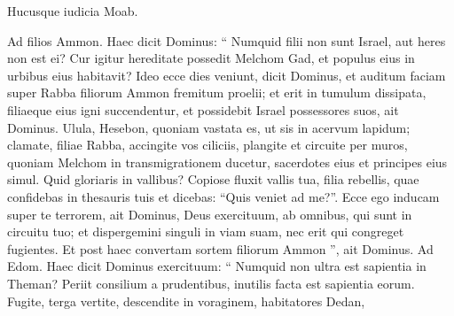 \begin{biblechapter}
\begin{biblechapter}
\begin{biblechapter}
\begin{biblechapter}
\begin{biblechapter}
\begin{biblechapter}
\begin{biblechapter}
\begin{biblechapter}
\begin{biblechapter}
\begin{biblechapter}
\begin{biblechapter}
\begin{biblechapter}
\begin{biblechapter}
\begin{biblechapter}
\begin{biblechapter}
\begin{biblechapter}
\begin{biblechapter}
\begin{biblechapter}
\begin{biblechapter}
\begin{biblechapter}
\begin{biblechapter}
\begin{biblechapter}
\begin{biblechapter}
\begin{biblechapter}
\begin{biblechapter}
\begin{biblechapter}
\begin{biblechapter}
\begin{biblechapter}
\begin{biblechapter}
\begin{biblechapter}
\begin{biblechapter}
\begin{biblechapter}
\begin{biblechapter}
\begin{biblechapter}
\begin{biblechapter}
\begin{biblechapter}
\begin{biblechapter}
\begin{biblechapter}
\begin{biblechapter}
\begin{biblechapter}
\begin{biblechapter}
\begin{biblechapter}
\begin{biblechapter}
\begin{biblechapter}
\begin{biblechapter}
\begin{biblechapter}
\begin{biblechapter}
\begin{biblechapter}
 Hucusque iudicia Moab.
 
\begin{biblechapter}
\verse Ad filios Ammon.
 Haec dicit Dominus:
 “ Numquid filii non sunt Israel,
 aut heres non est ei?
 Cur igitur hereditate possedit Melchom Gad,
 et populus eius in urbibus eius habitavit?
 \verse Ideo ecce dies veniunt,
 dicit Dominus,
 et auditum faciam super Rabba filiorum Ammon
 fremitum proelii;
 et erit in tumulum dissipata,
 filiaeque eius igni succendentur,
 et possidebit Israel possessores suos, ait Dominus.
 \verse Ulula, Hesebon, quoniam vastata es, ut sis in acervum lapidum;
 clamate, filiae Rabba,
 accingite vos ciliciis, plangite
 et circuite per muros,
 quoniam Melchom in transmigrationem ducetur,
 sacerdotes eius et principes eius simul.
 \verse Quid gloriaris in vallibus?
 Copiose fluxit vallis tua, filia rebellis,
 quae confidebas in thesauris tuis
 et dicebas: “Quis veniet ad me?”.
 \verse Ecce ego inducam super te terrorem,
 ait Dominus, Deus exercituum,
 ab omnibus, qui sunt in circuitu tuo;
 et dispergemini singuli in viam suam,
 nec erit qui congreget fugientes.
 \verse Et post haec convertam
 sortem filiorum Ammon ”,
 ait Dominus.
 \verse Ad Edom.
 Haec dicit Dominus exercituum:
 “ Numquid non ultra est sapientia in Theman?
 Periit consilium a prudentibus,
 inutilis facta est sapientia eorum.
 \verse Fugite, terga vertite, descendite in voraginem,
 habitatores Dedan,

\end{biblechapter}
\end{biblechapter}
\end{biblechapter}
\end{biblechapter}
\end{biblechapter}
\end{biblechapter}
\end{biblechapter}
\end{biblechapter}
\end{biblechapter}
\end{biblechapter}
\end{biblechapter}
\end{biblechapter}
\end{biblechapter}
\end{biblechapter}
\end{biblechapter}
\end{biblechapter}
\end{biblechapter}
\end{biblechapter}
\end{biblechapter}
\end{biblechapter}
\end{biblechapter}
\end{biblechapter}
\end{biblechapter}
\end{biblechapter}
\end{biblechapter}
\end{biblechapter}
\end{biblechapter}
\end{biblechapter}
\end{biblechapter}
\end{biblechapter}
\end{biblechapter}
\end{biblechapter}
\end{biblechapter}
\end{biblechapter}
\end{biblechapter}
\end{biblechapter}
\end{biblechapter}
\end{biblechapter}
\end{biblechapter}
\end{biblechapter}
\end{biblechapter}
\end{biblechapter}
\end{biblechapter}
\end{biblechapter}
\end{biblechapter}
\end{biblechapter}
\end{biblechapter}
\end{biblechapter}
\end{biblechapter}
